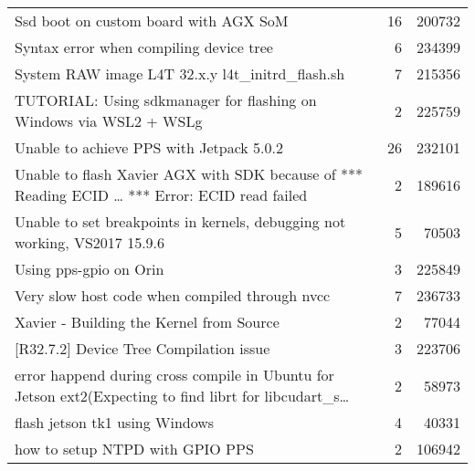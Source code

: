 \begin{longtable}{p{}rr}
    Ssd boot on custom board with AGX SoM                                                                                              & 16      & 200732 \\
    Syntax error when compiling device tree                                                                                            & 6       & 234399 \\
    System RAW image L4T 32.x.y l4t\_initrd\_flash.sh                                                                                  & 7       & 215356 \\
    TUTORIAL: Using sdkmanager for flashing on Windows via WSL2 + WSLg                                                                 & 2       & 225759 \\
    Unable to achieve PPS with Jetpack 5.0.2                                                                                           & 26      & 232101 \\
    Unable to flash Xavier AGX with SDK because of *** Reading ECID … *** Error: ECID read failed                                      & 2       & 189616 \\
    Unable to set breakpoints in kernels, debugging not working, VS2017 15.9.6                                                         & 5       & 70503  \\
    Using pps-gpio on Orin                                                                                                             & 3       & 225849 \\
    Very slow host code when compiled through nvcc                                                                                     & 7       & 236733 \\
    Xavier - Building the Kernel from Source                                                                                           & 2       & 77044  \\
    {[}R32.7.2{]} Device Tree Compilation issue                                                                                        & 3       & 223706 \\
    error happend during cross compile in Ubuntu for Jetson ext2(Expecting to find librt for libcudart\_s…                             & 2       & 58973  \\
    flash jetson tk1 using Windows                                                                                                     & 4       & 40331  \\
    how to setup NTPD with GPIO PPS                                                                                                    & 2       & 106942 \\

\end{longtable}
